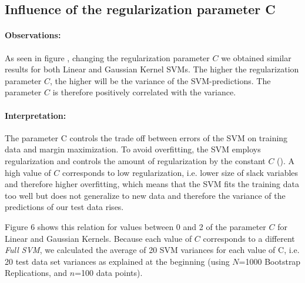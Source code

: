 \documentclass[a4paper]{article}
\begin{document}
\subsection{Influence of the regularization parameter C}
\paragraph{Observations:}
As seen in figure \label{fig3}, changing the regularization parameter $C$ we obtained similar results for both Linear and Gaussian Kernel SVMs. The higher the regularization parameter $C$, the higher will be the variance of the SVM-predictions. The parameter $C$ is therefore positively correlated with the variance.
\paragraph{Interpretation:}
The parameter C controls the trade off between errors of the SVM on training data and margin maximization. To avoid overfitting, the SVM employs regularization and controls the amount of regularization by the constant $C$ (\cite{hastie_elements_2005}). A high value of $C$ corresponds to low regularization, i.e. lower size of slack variables and therefore higher overfitting, which means that the SVM fits the training data too well but does not generalize to new data and therefore the variance of the predictions of our test data rises.

Figure 6 shows this relation for values between 0 and 2 of the parameter $C$ 
for Linear and Gaussian Kernels. Because each value of $C$ corresponds to a different \textit{Full SVM}, we calculated the average of 20 SVM variances for each value of C, i.e. 20 test data set variances as explained at the beginning (using $N$=1000 Bootstrap Replications, and $n$=100 data points).
 
\end{document}
